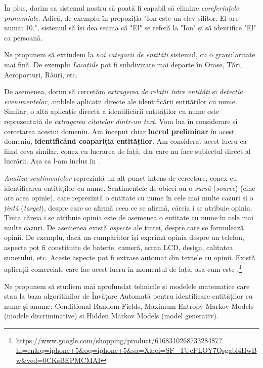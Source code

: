 În plus, dorim ca sistemul nostru să poată fi capabil să elimine \textit{coreferințele pronomiale}. Adică, de exemplu în propoziția "Ion este un elev silitor. El are numai 10.", sistemul să își dea seama că "El" se referă la "Ion" și să identifice "El" ca persoană.

Ne propunem să extindem la \textit{noi categorii de entități} sistemul, cu o granularitate mai fină. De exemplu \textit{Locațiile} pot fi subdivizate mai departe în Orașe, Tări, Aeroporturi, Râuri, etc.

De asemenea, dorim să cercetăm \textit{extragerea de relații între entități} și \textit{detecția evenimentelor}, amblele aplicații directe ale identificării entităților cu nume. Similar, o altă aplicație directă a identificării entităților cu nume este reprezentată de \textit{extragerea citatelor dintr-un text}. Vom lua în considerare și cercetarea acestui domeniu. Am început chiar \textbf{lucrul preliminar} în acest domeniu, \textbf{identificând coapariția entităților}. Am considerat acest lucru ca fiind ceva similar, conex cu lucrarea de față, dar care nu face subiectul direct al lucrării. Așa ca l-am inclus în .

\textit{Analiza sentimentelor} reprezintă un alt punct intens de cercetare, conex cu identificarea entităților cu nume. Sentimentele de obicei au o \textit{sursă} (\textit{source}) (cine are acea opinie), care reprezintă o entitate cu nume în cele mai multe cazuri și o \textit{țintă} (\textit{target}), despre care se afirmă ceea ce se afirmă, căreia i se atribuie opinia. Ținta căreia i se atribuie opinia este de asemenea o entitate cu nume în cele mai multe cazuri. De asemenea există \textit{aspecte} ale țintei, despre care se formulează opinii. De exemplu, dacă un cumpărător își exprimă opinia despre un telefon, aspecte pot fi constituite de baterie, cameră, ecran LCD, design, calitatea sunetului, etc. Aceste aspecte pot fi extrase automat din textele cu opinii. Există aplicații comerciale care fac acest lucru în momentul de față, așa cum este \textit{}.\footnote{\url{https://www.google.com/shopping/product/616831026873328487?hl=en\&q=iphone+5\&oq=iphone+5\&sa=X\&ei=SF_TUcPLOY7Qsgabl4HwBw\&ved=0CKsBEPMCMAI}}

Ne propunem să studiem mai aprofundat tehnicile și modelele matematice care stau la baza algoritmilor de Învățare Automată pentru identificare entităților cu nume și anume: Conditional Random Fields, Maximum Entropy Markov Models (modele discriminative) si Hidden Markov Models (model generativ). 

